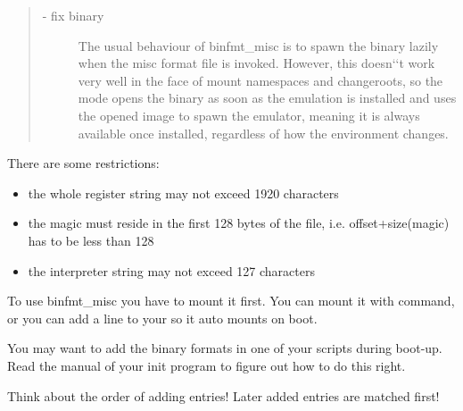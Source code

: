 \documentclass[a4paper,8pt,english]{sphinxmanual}
\begin{document}
\begin{itemize}
\begin{description}
\begin{quote}
\begin{description}
\item[{ - fix binary}] \leavevmode
The usual behaviour of binfmt\_misc is to spawn the
binary lazily when the misc format file is invoked.  However,
this doesn{}`{}`t work very well in the face of mount namespaces and
changeroots, so the  mode opens the binary as soon as the
emulation is installed and uses the opened image to spawn the
emulator, meaning it is always available once installed,
regardless of how the environment changes.

\end{description}
\end{quote}

\end{description}

\end{itemize}

There are some restrictions:
\begin{itemize}
\item {} 
the whole register string may not exceed 1920 characters

\item {} 
the magic must reside in the first 128 bytes of the file, i.e.
offset+size(magic) has to be less than 128

\item {} 
the interpreter string may not exceed 127 characters

\end{itemize}

To use binfmt\_misc you have to mount it first. You can mount it with
 command, or you can add
a line  to your
 so it auto mounts on boot.

You may want to add the binary formats in one of your  scripts during
boot-up. Read the manual of your init program to figure out how to do this
right.

Think about the order of adding entries! Later added entries are matched first!
\end{document}
